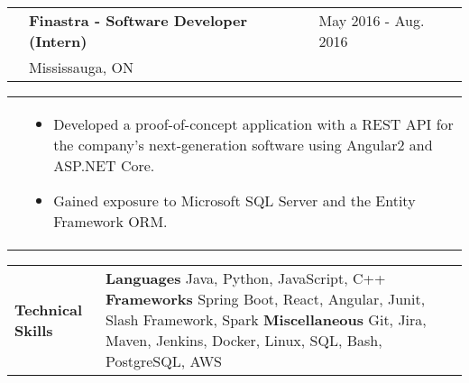 \documentclass[letter, 10.5pt]{article}
\newcommand\sectionspacing{0.6cm}
\newcommand\workspacing{0.4cm}
\newcommand\bulletspacing{-0.15cm}
\newcommand\firstcolwidth{2.5cm}
\newcommand\listwidth{0.809\textwidth}
\begin{document}
    \newline
    \vspace{\workspacing}
    \newline
    \begin{tabularx}{\textwidth}{@{}p{\firstcolwidth}Xl}
        & \textbf{Finastra - Software Developer (Intern)} & May 2016 - Aug. 2016 \\
        & Mississauga, ON & \\
    \end{tabularx}
    \newline
    \begin{tabularx}{\textwidth}{@{}p{\firstcolwidth}X}
        & 
        \begin{minipage}[t]{\listwidth}
            \begin{itemize}
                \vspace{-0.3cm}
                \item Developed a proof-of-concept application with a REST API for the company’s next-generation software using Angular2 and ASP.NET Core.
                \vspace{\bulletspacing}
                \item Gained exposure to Microsoft SQL Server and the Entity Framework ORM.
            \end{itemize}
        \end{minipage} \\
    \end{tabularx}
    \newline
    \vspace{\sectionspacing}
    \newline
    \begin{tabularx}{\textwidth}{@{}p{\firstcolwidth}X}
        \textbf{Technical Skills} & 
        \textbf{Languages}
        \newline
        Java, Python, JavaScript, C++
        \newline
        \newline
        \textbf{Frameworks}
        \newline
        Spring Boot, React, Angular, Junit, Slash Framework, Spark
        \newline
        \newline
        \textbf{Miscellaneous}
        \newline
        Git, Jira, Maven, Jenkins, Docker, Linux, SQL, Bash, PostgreSQL, AWS \\
    \end{tabularx}
\end{document}
